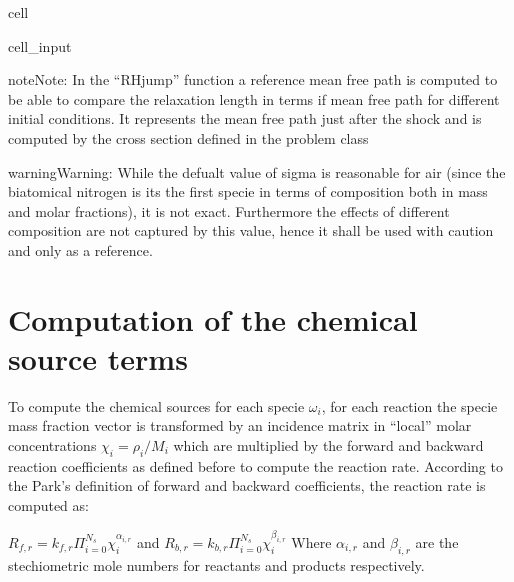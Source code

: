 \documentclass[letterpaper,10pt,english]{jupyterBook}
\begin{document}
\begin{sphinxuseclass}{cell}
\begin{sphinxVerbatimInput}
\begin{sphinxuseclass}{cell_input}
\begin{sphinxVerbatim}[commandchars=\\\{\}]
  
  
\end{sphinxVerbatim}

\end{sphinxuseclass}\end{sphinxVerbatimInput}

\end{sphinxuseclass}
\begin{sphinxadmonition}{note}{Note:}
\sphinxAtStartPar
In the “RHjump” function a reference mean free path is computed to be able to compare the relaxation length in terms if mean free path for different initial conditions. It represents the mean free path just after the shock and is computed by the cross section defined in the problem class
\end{sphinxadmonition}

\begin{sphinxadmonition}{warning}{Warning:}
\sphinxAtStartPar
While the defualt value of sigma is reasonable for air (since the bi\sphinxhyphen{}atomical nitrogen is its the first specie in terms of composition both in mass and molar fractions), it is not exact. Furthermore the effects of different composition are not captured by this value, hence it shall be used with caution and only as a reference.
\end{sphinxadmonition}


\section{Computation of the chemical source terms}
\label{\detokenize{1_Temperature/Problem_class_definition:computation-of-the-chemical-source-terms}}
\sphinxAtStartPar
To compute the chemical sources for each specie \(\omega_i\), for each reaction the specie mass fraction vector is transformed by an incidence matrix in “local” molar concentrations \(\chi_i = \rho_i/M_i\) which are multiplied by the forward and backward reaction coefficients as defined before to compute the reaction rate. 
According to the Park’s definition of forward and backward coefficients, the reaction rate is computed as: 

\sphinxAtStartPar
\(R_{f,r} = k_{f,r} \Pi_{i = 0}^{N_{s}} \chi_i^{\alpha_{i,r}} \) 
and 
\(R_{b,r} = k_{b,r} \Pi_{i = 0}^{N_{s}} \chi_i^{\beta_{i,r}} \) 
Where \(\alpha_{i,r}\) and \(\beta_{i,r}\) are the stechiometric mole numbers for reactants and products respectively.
\end{document}
